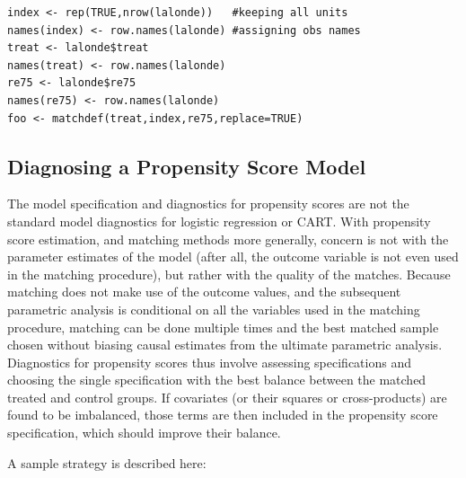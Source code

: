 \documentclass[oneside,letterpaper,titlepage]{article}
\begin{document}
\begin{verbatim}
index <- rep(TRUE,nrow(lalonde))   #keeping all units
names(index) <- row.names(lalonde) #assigning obs names
treat <- lalonde$treat
names(treat) <- row.names(lalonde)
re75 <- lalonde$re75
names(re75) <- row.names(lalonde)
foo <- matchdef(treat,index,re75,replace=TRUE)
\end{verbatim}

\subsection{Diagnosing a Propensity Score Model}
\label{pscorespec}
The model specification and diagnostics for propensity scores are not
the standard model diagnostics for logistic regression or CART.  With
propensity score estimation, and matching methods more generally,
concern is not with the parameter estimates of the model (after all,
the outcome variable is not even used in the matching procedure), but
rather with the quality of the matches.  Because matching does not
make use of the outcome values, and the subsequent parametric analysis
is conditional on all the variables used in the matching procedure,
matching can be done multiple times and the best matched sample chosen
without biasing causal estimates from the ultimate parametric
analysis.  Diagnostics for propensity scores thus involve assessing
specifications and choosing the single specification with the best
balance between the matched treated and control groups.  If covariates
(or their squares or cross-products) are found to be imbalanced, those
terms are then included in the propensity score specification, which
should improve their balance.  

A sample strategy is described here:
\end{document}
